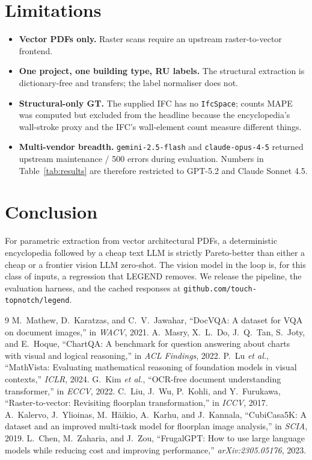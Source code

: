 \documentclass[conference]{IEEEtran}
\begin{document}
\section{Limitations}
\label{sec:limitations}
\begin{itemize}
\item \textbf{Vector PDFs only.} Raster scans require an upstream
raster-to-vector frontend.
\item \textbf{One project, one building type, RU labels.} The structural
extraction is dictionary-free and transfers; the label normaliser does not.
\item \textbf{Structural-only GT.} The supplied IFC has no
\texttt{IfcSpace}; counts MAPE was computed but excluded from the headline
because the encyclopedia's wall-stroke proxy and the IFC's wall-element
count measure different things.
\item \textbf{Multi-vendor breadth.} \texttt{gemini-2.5-flash} and
\texttt{claude-opus-4-5} returned upstream maintenance / 500 errors during
evaluation. Numbers in Table~\ref{tab:results} are therefore restricted to
GPT-5.2 and Claude Sonnet 4.5.
\end{itemize}

\section{Conclusion}
For parametric extraction from vector architectural PDFs, a deterministic
encyclopedia followed by a cheap text LLM is strictly Pareto-better than
either a cheap or a frontier vision LLM zero-shot. The vision model in the
loop is, for this class of inputs, a regression that LEGEND removes. We
release the pipeline, the evaluation harness, and the cached responses at
\texttt{github.com/touch-topnotch/legend}.


\begin{thebibliography}{9}
 M.~Mathew, D.~Karatzas, and C.~V.~Jawahar,
``DocVQA: A dataset for VQA on document images,'' in \emph{WACV}, 2021.
 A.~Masry, X.~L.~Do, J.~Q.~Tan, S.~Joty, and E.~Hoque,
``ChartQA: A benchmark for question answering about charts with visual and
logical reasoning,'' in \emph{ACL Findings}, 2022.
 P.~Lu \emph{et al.}, ``MathVista: Evaluating mathematical
reasoning of foundation models in visual contexts,'' \emph{ICLR}, 2024.
 G.~Kim \emph{et al.}, ``OCR-free document understanding
transformer,'' in \emph{ECCV}, 2022.
 C.~Liu, J.~Wu, P.~Kohli, and Y.~Furukawa,
``Raster-to-vector: Revisiting floorplan transformation,'' in \emph{ICCV},
2017.
 A.~Kalervo, J.~Ylioinas, M.~H{\"a}ikio, A.~Karhu, and
J.~Kannala, ``CubiCasa5K: A dataset and an improved multi-task model for
floorplan image analysis,'' in \emph{SCIA}, 2019.
 L.~Chen, M.~Zaharia, and J.~Zou,
``FrugalGPT: How to use large language models while reducing cost and
improving performance,'' \emph{arXiv:2305.05176}, 2023.
\end{thebibliography}
\end{document}

